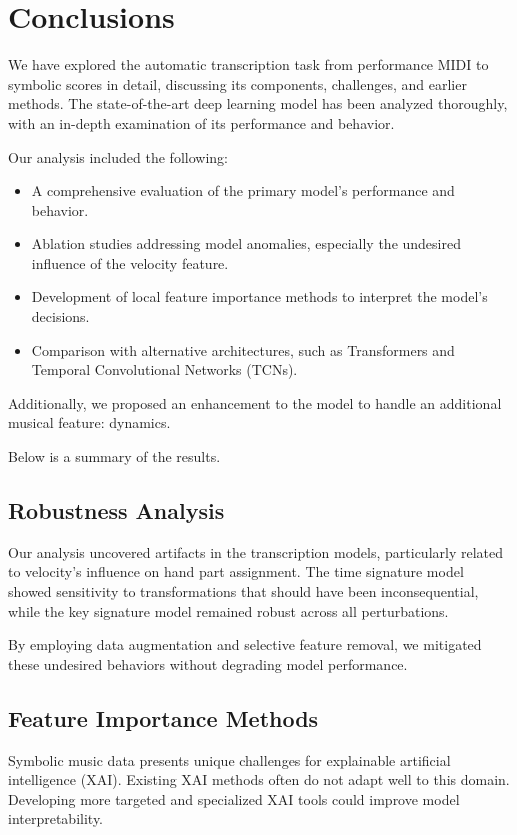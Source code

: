 \chapter{Conclusions}\label{conclusions}

We have explored the automatic transcription task from performance MIDI to symbolic scores in detail, discussing its components, challenges, and earlier methods. The state-of-the-art deep learning model has been analyzed thoroughly, with an in-depth examination of its performance and behavior.

Our analysis included the following: \begin{itemize}
	\item A comprehensive evaluation of the primary model's performance and behavior.
	\item Ablation studies addressing model anomalies, especially the undesired influence of the velocity feature.
	\item Development of local feature importance methods to interpret the model's decisions.
	\item Comparison with alternative architectures, such as Transformers and Temporal Convolutional Networks (TCNs). \end{itemize}

Additionally, we proposed an enhancement to the model to handle an additional musical feature: dynamics.

Below is a summary of the results.

\section{Robustness Analysis}

Our analysis uncovered artifacts in the transcription models, particularly related to velocity's influence on hand part assignment. The time signature model showed sensitivity to transformations that should have been inconsequential, while the key signature model remained robust across all perturbations.

By employing data augmentation and selective feature removal, we mitigated these undesired behaviors without degrading model performance.

\section{Feature Importance Methods}

Symbolic music data presents unique challenges for explainable artificial intelligence (XAI). Existing XAI methods often do not adapt well to this domain. Developing more targeted and specialized XAI tools could improve model interpretability.

